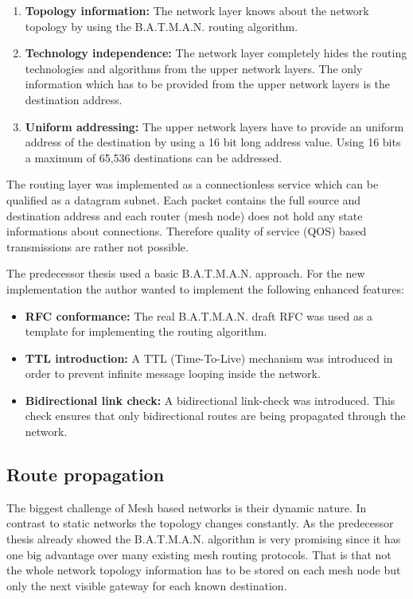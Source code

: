 \begin{enumerate}
    \item \textbf{Topology information:} The network layer knows about the network topology by using the B.A.T.M.A.N. routing algorithm.
    \item \textbf{Technology independence:} The network layer completely hides the routing technologies and algorithms from the upper network layers. The only information which has to be provided from the upper network layers is the destination address.
    \item \textbf{Uniform addressing:} The upper network layers have to provide an uniform address of the destination by using a 16 bit long address value. Using 16 bits a maximum of 65,536 destinations can be addressed.
\end{enumerate}

The routing layer was implemented as a connectionless service which can be qualified as a datagram subnet. Each packet contains the full source and destination address and each router (mesh node) does not hold any state informations about connections. Therefore quality of service (QOS) based transmissions are rather not possible.

The predecessor thesis used a basic B.A.T.M.A.N. approach. For the new implementation the author wanted to implement the following enhanced features:

\begin{itemize}
    \item \textbf{RFC conformance:} The real B.A.T.M.A.N. draft RFC \cite{batmanrfc} was used as a template for implementing the routing algorithm.
    \item \textbf{TTL introduction:} A TTL (Time-To-Live) mechanism was introduced in order to prevent infinite message looping inside the network.
    \item \textbf{Bidirectional link check:} A bidirectional link-check was introduced. This check ensures that only bidirectional routes are being propagated through the network.
\end{itemize}

\subsection{Route propagation}%
\label{sub:route_propagation}
The biggest challenge of Mesh based networks is their dynamic nature. In contrast to static networks the topology changes constantly. As the predecessor thesis already showed the B.A.T.M.A.N. algorithm is very promising since it has one big advantage over many existing mesh routing protocols. That is that not the whole network topology information has to be stored on each mesh node but only the next visible gateway for each known destination.

